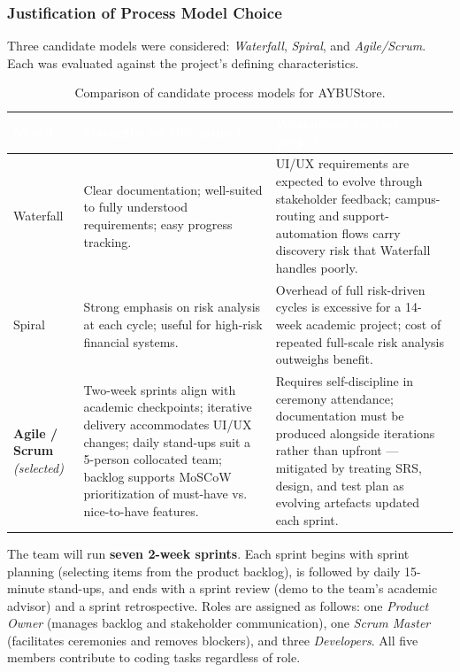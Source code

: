 \documentclass[11pt,a4paper]{article}
\begin{document}
\subsubsection*{Justification of Process Model Choice}
Three candidate models were considered: \emph{Waterfall},
\emph{Spiral}, and \emph{Agile/Scrum}. Each was evaluated against the
project's defining characteristics.

\begin{table}[H]
\centering
\small
\begin{tabular}{|p{}|p{}|p{}|}
\hline
\rowcolor{aybuHeader}
\textcolor{white}{\textbf{Model}} &
\textcolor{white}{\textbf{Strengths for this project}} &
\textcolor{white}{\textbf{Weaknesses for this project}} \\ \hline

Waterfall & Clear documentation; well-suited to fully understood
requirements; easy progress tracking. & UI/UX requirements are
expected to evolve through stakeholder feedback; campus-routing and
support-automation flows carry discovery risk that Waterfall handles
poorly. \\ \hline

Spiral & Strong emphasis on risk analysis at each cycle; useful for
high-risk financial systems. & Overhead of full risk-driven cycles is
excessive for a 14-week academic project; cost of repeated full-scale
risk analysis outweighs benefit. \\ \hline

\textbf{Agile / Scrum} \emph{(selected)} & Two-week sprints align with
academic checkpoints; iterative delivery accommodates UI/UX changes;
daily stand-ups suit a 5-person collocated team; backlog supports
MoSCoW prioritization of must-have vs. nice-to-have features. &
Requires self-discipline in ceremony attendance; documentation must
be produced alongside iterations rather than upfront --- mitigated by
treating SRS, design, and test plan as evolving artefacts updated
each sprint. \\ \hline
\end{tabular}
\caption{Comparison of candidate process models for AYBUStore.}
\label{tab:process-models}
\end{table}

The team will run \textbf{seven 2-week sprints}. Each sprint begins
with sprint planning (selecting items from the product backlog), is
followed by daily 15-minute stand-ups, and ends with a sprint review
(demo to the team's academic advisor) and a sprint retrospective.
Roles are assigned as follows: one \emph{Product Owner} (manages
backlog and stakeholder communication), one \emph{Scrum Master}
(facilitates ceremonies and removes blockers), and three
\emph{Developers}. All five members contribute to coding tasks
regardless of role.
\end{document}
